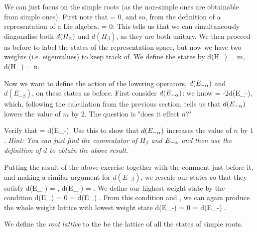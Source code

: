 We can just focus on the simple roots (as the non-simple ones are obtainable from simple ones). First note that 
\bse 
    [H_{\a},H_{\beta}] = 0,
\ese 
and so, from the definition of a representation of a Lie algebra, 
\bse 
    [d(H_{\a}), d(H_{\beta})] = 0.
\ese    
This tells us that we can simultaneously diagonalise both $d(H_{\alpha})$ and $d(H_{\beta})$, as they are both unitary. We then proceed as before to label the states of the representation space, but now we have two weights (i.e. eigenvalues) to keep track of. We define the states by 
\be 
    d(H_{\a}) = m, \qand d(H_{\beta}) = n.
\ee 

Now we want to define the action of the lowering operators, $d(E_{-\alpha})$ and $d(E_{-\beta})$, on these states as before. First consider $d(E_{-\alpha})$: we know
\bse 
    [d(H_{\a}),d(E_{-\a})] = -2d(E_{-\a}),
\ese 
which, following the calculation from the previous section, tells us that $d(E_{-\alpha})$ lowers the value of $m$ by $2$. The question is "does it effect $n$?" 

\bbox 
    Verify that 
    \bse 
        [d(H_{\beta}),d(E_{-\a})] =  d(E_{-\a}).
    \ese 
    Use this to show that $d(E_{-\alpha})$ increases the value of $n$ by $1$. \textit{Hint: You can just find the commutator of $H_{\beta}$ and $E_{-\alpha}$ and then use the definition of $d$ to obtain the above result. }
\ebox 

Putting the result of the above exercise together with the comment just before it, and making a similar argument for $d(E_{-\beta})$, we rescale our states so that they satisfy
\be 
\label{eqn:su(3)statesRaisingLowering}
    d(E_{-\a})  = , \qand d(E_{-\beta})  = .
\ee 
We define our highest weight state by the condition 
\bse 
    d(E_{\a})  = 0 = d(E_{\beta}) .
\ese 
From this condition and , we can again produce the whole weight lattice with lowest weight state 
\bse 
    d(E_{-\a})  = 0 = d(E_{-\beta}) .
\ese 

    We define the \textit{root lattice} to the be the lattice of all the states of simple roots.
\ed 

